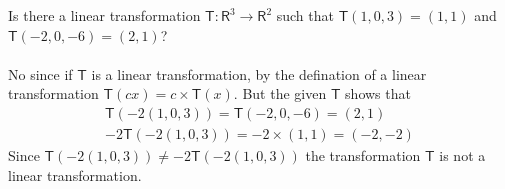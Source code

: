 Is there a linear transformation $\mathsf{T}\colon\mathsf{R}^3 \to
\mathsf{R}^2$ such that $\mathsf{T}(1,0,3) = (1,1)$ and
$\mathsf{T}(-2,0,-6) = (2,1)$?
\paragraph{} No since if $\mathsf{T}$ is a linear transformation, by the
defination of a linear transformation $\mathsf{T}(cx) =
c\times\mathsf{T}(x)$. But the given $\mathsf{T}$ shows that
\begin{align}
\mathsf{T}(-2(1,0,3)) = \mathsf{T}(-2,0,-6) = (2,1)\\
-2\mathsf{T}(-2(1,0,3)) = -2 \times (1,1) = (-2,-2)
\end{align}
Since $\mathsf{T}(-2(1,0,3)) \neq -2\mathsf{T}(-2(1,0,3))$ the
transformation $\mathsf{T}$ is not a linear transformation.
